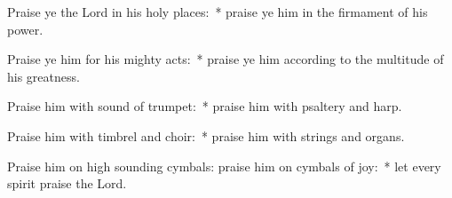 \begin{enpars}
\item Praise ye the Lord in his holy places:~* praise ye him in the firmament of his power.
\item Praise ye him for his mighty acts:~* praise ye him according to the multitude of his greatness.
\item Praise him with sound of trumpet:~* praise him with psaltery and harp.
\item Praise him with timbrel and choir:~* praise him with strings and organs.
\item Praise him on high sounding cymbals: praise him on cymbals of joy:~* let every spirit praise the Lord.
\end{enpars}